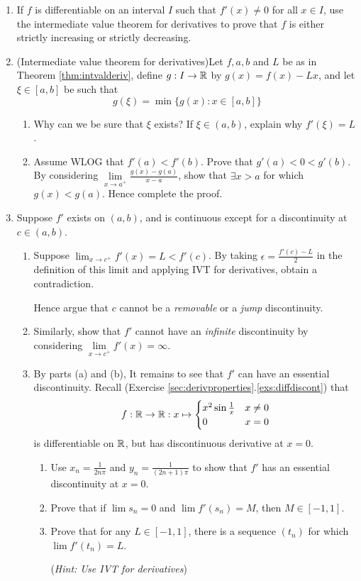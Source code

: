 \begin{exercises}{}
\begin{enumerate}
		
	  \item\label{exs:fincdec} If $f$ is differentiable on an interval $I$ such that $f'(x)\neq 0$ for all $x\in I$, use the intermediate value theorem for derivatives to prove that $f$ is either strictly increasing or strictly decreasing.
	  
	  
	  \item\label{exs:ivtderivs} (Intermediate value theorem for derivatives)\quad Let $f,a,b$ and $L$ be as in Theorem \ref{thm:intvalderiv}, define $g:I\to\mathbb{R}$ by $g(x)=f(x)-Lx$, and let $\xi\in[a,b]$ be such that
		\[
			g(\xi)=\min\bigl\{g(x):x\in[a,b]\bigr\}
		\]
		\begin{enumerate}
		  \item Why can we be sure that $\xi$ exists? If $\xi\in(a,b)$, explain why $f'(\xi)=L$.
			\item Assume WLOG that $f'(a)<f'(b)$. Prove that $g'(a)<0<g'(b)$. By considering $\lim\limits_{x\to a^+}\frac{g(x)-g(a)}{x-a}$, show that $\exists x>a$ for which $g(x)<g(a)$. Hence complete the proof.
		\end{enumerate}
	  
	  
	  \item Suppose $f'$ exists on $(a,b)$, and is continuous except for a discontinuity at $c\in(a,b)$.
	  \begin{enumerate}
	    \item Suppose $\lim_{x\to c^+}f'(x)=L<f'(c)$. By taking $\epsilon=\frac{f'(c)-L}2$ in the definition of this limit and applying IVT for derivatives, obtain a contradiction.\par
	    Hence argue that $c$ cannot be a \emph{removable} or a \emph{jump} discontinuity.
	    
	    \item Similarly, show that $f'$ cannot have an \emph{infinite} discontinuity by considering $\lim\limits_{x\to c^+}f'(x)=\infty$.
	    
	  	\item By parts (a) and (b), It remains to see that $f'$ can have an essential discontinuity. Recall (Exercise \ref*{sec:derivproperties}.\ref{exs:diffdiscont}) that
			\[
				f:\mathbb{R}\to\mathbb{R}:x\mapsto 
				\begin{cases}
					x^2\sin\frac 1x&x\neq 0\\
					0&x=0
				\end{cases}
			\]
			is differentiable on $\mathbb{R}$, but has discontinuous derivative at $x=0$.
			\begin{enumerate}
	  		\item Use $x_n=\frac 1{2n\pi}$ and $y_n=\frac 1{(2n+1)\pi}$ to show that $f'$ has an essential discontinuity at $x=0$.
	  		\item Prove that if $\lim s_n=0$ and $\lim f'(s_n)=M$, then $M\in[-1,1]$.
				\item Prove that for any $L\in[-1,1]$, there is a sequence $(t_n)$ for which $\lim\limits f'(t_n)=L$.\par
				(\emph{Hint: Use IVT for derivatives})
			\end{enumerate}
	  \end{enumerate}
	\end{enumerate}
\end{exercises}


